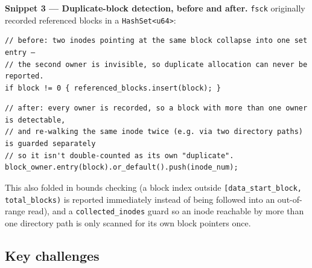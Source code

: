\documentclass[11pt]{article}
\begin{document}
\textbf{Snippet 3 --- Duplicate-block detection, before and after.} \texttt{fsck} originally recorded
referenced blocks in a \texttt{HashSet<u64>}:
\begin{lstlisting}
// before: two inodes pointing at the same block collapse into one set entry —
// the second owner is invisible, so duplicate allocation can never be reported.
if block != 0 { referenced_blocks.insert(block); }
\end{lstlisting}
\begin{lstlisting}
// after: every owner is recorded, so a block with more than one owner is detectable,
// and re-walking the same inode twice (e.g. via two directory paths) is guarded separately
// so it isn't double-counted as its own "duplicate".
block_owner.entry(block).or_default().push(inode_num);
\end{lstlisting}
This also folded in bounds checking (a block index outside \texttt{[data\_start\_block, total\_blocks)}
is reported immediately instead of being followed into an out-of-range read), and a
\texttt{collected\_inodes} guard so an inode reachable by more than one directory path is only
scanned for its own block pointers once.

\subsection{Key challenges}
\end{document}
